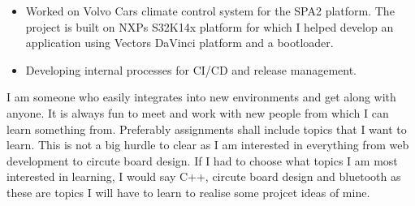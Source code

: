 \documentclass[10pt,a4paper,ragged2e,withhyper]{altacv}
\begin{document}
\begin{paracol}{2}

\begin{itemize}
\item Worked on Volvo Cars climate control system for the SPA2 platform. The project is 
built on NXPs S32K14x platform for which I helped develop an application using Vectors 
DaVinci platform and a bootloader. 
\item Developing internal processes for CI/CD and release management. 
\end{itemize}


I am someone who easily integrates into new environments and get along with anyone. 
It is always fun to meet and work with new people from which I can learn something from.
Preferably \newline assignments shall include topics that I want to learn. This is not a big hurdle
to clear as I am interested in everything from web development to circute board design. 
If I had to choose what topics I am most interested in learning, I would say C++, 
circute board design and bluetooth as these are topics I will have to learn to realise 
some projcet ideas of mine.

\medskip


\switchcolumn



\divider


\divider



\\


\end{paracol}
\end{document}
